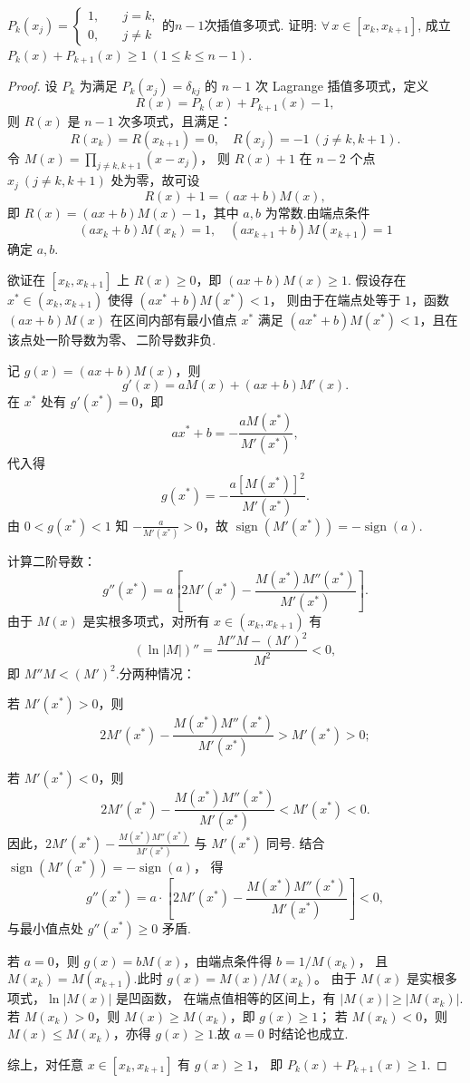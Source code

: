 \begin{5b}
\begin{enumerate}
\(P_k(x_j)=\begin{cases}
1,\quad&j=k,\\0,&j\ne k
\end{cases}\)的\(n-1\)次插值多项式. 证明: \(\forall\,x\in[x_k,x_{k+1}]\), 
成立\(P_k(x)+P_{k+1}(x)\geqslant 1\ (1\leqslant k\leqslant n-1)\).
\begin{proof}
设 \(P_k\) 为满足 \(P_k(x_j) = \delta_{kj}\) 的 \(n-1\) 次 Lagrange 插值多项式，定义
\[R(x) = P_k(x) + P_{k+1}(x) - 1,\]
则 \(R(x)\) 是 \(n-1\) 次多项式，且满足：
\[R(x_k) = R(x_{k+1}) = 0, \quad R(x_j) = -1 \ (j \neq k, k+1).\]
令 \(M(x) = \prod_{j \neq k, k+1} (x - x_j)\)，
则 \(R(x) + 1\) 在 \(n-2\) 个点 \(x_j \ (j \neq k, k+1)\) 处为零，故可设
\[R(x) + 1 = (ax + b) M(x),\]
即 \(R(x) = (ax + b) M(x) - 1\)，其中 \(a, b\) 为常数.由端点条件
\[(ax_k + b) M(x_k) = 1, \quad (ax_{k+1} + b) M(x_{k+1}) = 1\]
确定 \(a, b\).

欲证在 \([x_k, x_{k+1}]\) 上 \(R(x) \geqslant 0\)，即 \((ax + b) M(x) \geqslant 1\).
假设存在 \(x^* \in (x_k, x_{k+1})\) 使得 \((ax^* + b) M(x^*) < 1\)，
则由于在端点处等于 $1$，函数 \((ax + b) M(x)\) 在区间内部有最小值点 \(x^*\) 
满足 \((ax^* + b) M(x^*) < 1\)，且在该点处一阶导数为零、\,二阶导数非负.

记 \(g(x) = (ax + b) M(x)\)，则
\[g'(x) = a M(x) + (ax + b) M'(x).\]
在 \(x^*\) 处有 \(g'(x^*) = 0\)，即
\[ax^* + b = -\frac{a M(x^*)}{M'(x^*)},\]
代入得
\[g(x^*) = -\frac{a [M(x^*)]^2}{M'(x^*)}.\]
由 \(0 < g(x^*) < 1\) 知 \(-\frac{a}{M'(x^*)} > 0\)，故 \(\operatorname{sign}(M'(x^*)) = -\operatorname{sign}(a)\).

计算二阶导数：
\[g''(x^*) = a \left[ 2M'(x^*) - \frac{M(x^*) M''(x^*)}{M'(x^*)} \right].\]
由于 \(M(x)\) 是实根多项式，对所有 \(x \in (x_k, x_{k+1})\) 有
\[(\ln |M|)'' = \frac{M'' M - (M')^2}{M^2} < 0,\]
即 \(M'' M < (M')^2\).分两种情况：

若 \(M'(x^*) > 0\)，则 \[2M'(x^*) - \frac{M(x^*) M''(x^*)}{M'(x^*)} > M'(x^*) > 0;\]

若 \(M'(x^*) < 0\)，则 \[2M'(x^*) - \frac{M(x^*) M''(x^*)}{M'(x^*)} < M'(x^*) < 0.\]
因此，\(2M'(x^*) - \frac{M(x^*) M''(x^*)}{M'(x^*)}\) 与 \(M'(x^*)\) 同号.
结合 \(\operatorname{sign}(M'(x^*)) = -\operatorname{sign}(a)\)，
得 \[g''(x^*) = a \cdot \left[ 2M'(x^*) - \frac{M(x^*) M''(x^*)}{M'(x^*)} \right] < 0,\]
与最小值点处 \(g''(x^*) \geqslant 0\) 矛盾.

若 \(a = 0\)，则 \(g(x) = b M(x)\)，由端点条件得 \(b = 1 / M(x_k)\)，
且 \(M(x_k) = M(x_{k+1})\).此时 \(g(x) = M(x) / M(x_k)\)。
由于 \(M(x)\) 是实根多项式，\(\ln |M(x)|\) 是凹函数，
在端点值相等的区间上，有 \(|M(x)| \geqslant |M(x_k)|\).
若 \(M(x_k) > 0\)，则 \(M(x) \geqslant M(x_k)\)，即 \(g(x) \geqslant 1\)；
若 \(M(x_k) < 0\)，则 \(M(x) \leqslant M(x_k)\)，亦得 \(g(x) \geqslant 1\).故 \(a = 0\) 时结论也成立.

综上，对任意 \(x \in [x_k, x_{k+1}]\) 有 \(g(x) \geqslant 1\)，
即 \(P_k(x) + P_{k+1}(x) \geqslant 1\).
\end{proof}
\end{enumerate}
\end{5b}

